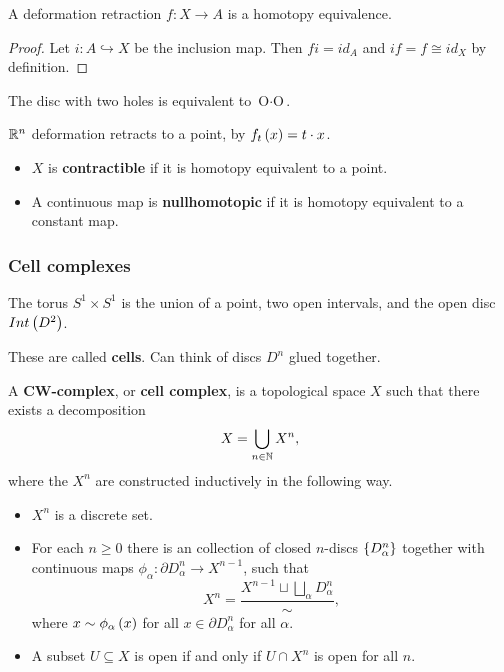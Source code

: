 \begin{lemma}
A deformation retraction $ f : X \to A $ is a homotopy equivalence.
\end{lemma}

\begin{proof}
Let $ i : A \hookrightarrow X $ be the inclusion map. Then $ fi = id_A $ and $ if = f \cong id_X $ by definition.
\end{proof}

\begin{example*}
The disc with two holes is equivalent to $ \text{O} \cdot \text{O} $.
\end{example*}

\begin{example*}
$ \mathbb{R}^n $ deformation retracts to a point, by $ f_t\br{x} = t \cdot x $.
\end{example*}

\begin{definition*}
\hfill
\begin{itemize}
\item $ X $ is \textbf{contractible} if it is homotopy equivalent to a point.
\item A continuous map is \textbf{nullhomotopic} if it is homotopy equivalent to a constant map.
\end{itemize}
\end{definition*}

\pagebreak

\subsubsection{Cell complexes}

\begin{example*}
The torus $ S^1 \times S^1 $ is the union of a point, two open intervals, and the open disc $ Int\br{D^2} $.
\end{example*}

These are called \textbf{cells}. Can think of discs $ D^n $ glued together.


\begin{definition*}
A \textbf{CW-complex}, or \textbf{cell complex}, is a topological space $ X $ such that there exists a decomposition
$$ X = \bigcup_{n \in \mathbb{N}} X^n, $$
where the $ X^n $ are constructed inductively in the following way.
\begin{itemize}
\item $ X^n $ is a discrete set.
\item For each $ n \ge 0 $ there is an collection of closed $ n $-discs $ \cbr{D_\alpha^n} $ together with continuous maps $ \phi_\alpha : \partial D_\alpha^n \to X^{n - 1} $, such that
$$ X^n = \dfrac{X^{n - 1} \sqcup \bigsqcup_\alpha D_\alpha^n}{\sim}, $$
where $ x \sim \phi_\alpha\br{x} $ for all $ x \in \partial D_\alpha^n $ for all $ \alpha $.
\item A subset $ U \subseteq X $ is open if and only if $ U \cap X^n $ is open for all $ n $.
\end{itemize}
\end{definition*}


